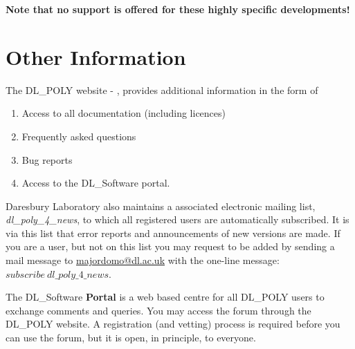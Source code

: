 {\bf Note that no support is offered for these highly specific
developments!}

\section{Other Information}\label{other}

The DL\_POLY website - \WEB{}, provides additional information in the form of
\begin{enumerate}
\item Access to all documentation (including licences)
\item Frequently asked questions
\item Bug reports
\item Access to the DL\_Software portal.
\end{enumerate}

\noindent
Daresbury Laboratory also maintains a \D associated electronic mailing
list, {\em dl\_poly\_4\_news}, to which all registered \D users
are automatically subscribed.  It is via this list that error reports
and announcements of new versions are made.  If you are a \D
user, but not on this list you may request to be added by sending
a mail message to {\href{mailto:majordomo@dl.ac.uk}{majordomo@dl.ac.uk}}
with the one-line message: $subscribe~dl\_poly\_4\_news$.

The DL\_Software {\bf Portal} is a web based centre for all DL\_POLY users
to exchange comments and queries.  You may access the forum through the
DL\_POLY website.  A registration (and vetting) process is required
before you can use the forum, but it is open, in principle, to everyone.
